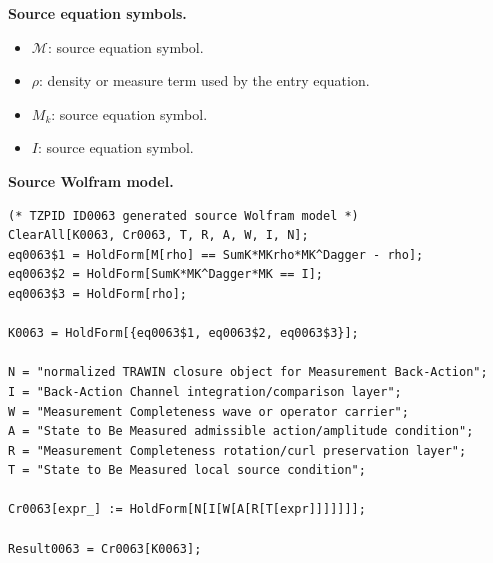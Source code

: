 \begin{minipage}[t]{0.49\linewidth}
\begingroup
\small
\raggedright
\textbf{Source equation symbols.}\par
\begin{itemize}[leftmargin=1.35em,itemsep=1pt,topsep=1pt,parsep=0pt]
    \item $\mathcal{M}$: source equation symbol.
    \item $\rho$: density or measure term used by the entry equation.
    \item $M_{k}$: source equation symbol.
    \item $I$: source equation symbol.
\end{itemize}
\endgroup
\end{minipage}\hfill
\begin{minipage}[t]{0.47\linewidth}
\begingroup
\scriptsize
\raggedright
\textbf{Source Wolfram model.}\par
\begin{Verbatim}[fontsize=\tiny,breaklines=true,breakanywhere=true]
(* TZPID ID0063 generated source Wolfram model *)
ClearAll[K0063, Cr0063, T, R, A, W, I, N];
eq0063$1 = HoldForm[M[rho] == SumK*MKrho*MK^Dagger - rho];
eq0063$2 = HoldForm[SumK*MK^Dagger*MK == I];
eq0063$3 = HoldForm[rho];

K0063 = HoldForm[{eq0063$1, eq0063$2, eq0063$3}];

N = "normalized TRAWIN closure object for Measurement Back-Action";
I = "Back-Action Channel integration/comparison layer";
W = "Measurement Completeness wave or operator carrier";
A = "State to Be Measured admissible action/amplitude condition";
R = "Measurement Completeness rotation/curl preservation layer";
T = "State to Be Measured local source condition";

Cr0063[expr_] := HoldForm[N[I[W[A[R[T[expr]]]]]]];

Result0063 = Cr0063[K0063];
\end{Verbatim}
\endgroup
\end{minipage}

